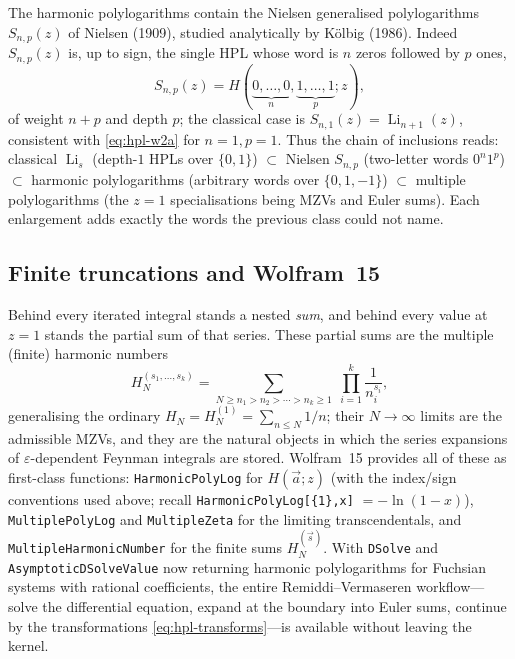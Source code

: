 \documentclass[11pt]{article}
\DeclareMathOperator{\Li}{Li}
\theoremstyle{plain}
\theoremstyle{remark}
\begin{document}
The harmonic polylogarithms contain the Nielsen generalised polylogarithms $S_{n,p}(z)$ of Nielsen (1909), studied analytically by K\"olbig (1986). Indeed $S_{n,p}(z)$ is, up to sign, the single HPL whose word is $n$ zeros followed by $p$ ones,
\begin{equation}\label{eq:nielsen}
  S_{n,p}(z)=H(\underbrace{0,\dots,0}_{n},\underbrace{1,\dots,1}_{p};z),
\end{equation}
of weight $n+p$ and depth $p$; the classical case is $S_{n,1}(z)=\Li_{n+1}(z)$, consistent with \eqref{eq:hpl-w2a} for $n=1,p=1$. Thus the chain of inclusions reads: classical $\Li_s$ (depth-$1$ HPLs over $\{0,1\}$) $\subset$ Nielsen $S_{n,p}$ (two-letter words $0^n1^p$) $\subset$ harmonic polylogarithms (arbitrary words over $\{0,1,-1\}$) $\subset$ multiple polylogarithms (the $z=1$ specialisations being MZVs and Euler sums). Each enlargement adds exactly the words the previous class could not name.

\subsection{Finite truncations and Wolfram~15}

Behind every iterated integral stands a nested \emph{sum}, and behind every value at $z=1$ stands the partial sum of that series. These partial sums are the multiple (finite) harmonic numbers
\[
  H^{(s_1,\dots,s_k)}_{N}=\sum_{N\ge n_1>n_2>\cdots>n_k\ge1}\;\prod_{i=1}^{k}\frac{1}{n_i^{s_i}},
\]
generalising the ordinary $H_N=H_N^{(1)}=\sum_{n\le N}1/n$; their $N\to\infty$ limits are the admissible MZVs, and they are the natural objects in which the series expansions of $\varepsilon$-dependent Feynman integrals are stored. Wolfram~15 provides all of these as first-class functions: \texttt{HarmonicPolyLog} for $H(\vec a;z)$ (with the index/sign conventions used above; recall \texttt{HarmonicPolyLog[\{1\},x]} $=-\ln(1-x)$), \texttt{MultiplePolyLog} and \texttt{MultipleZeta} for the limiting transcendentals, and \texttt{MultipleHarmonicNumber} for the finite sums $H^{(\vec s)}_N$. With \texttt{DSolve} and \texttt{AsymptoticDSolveValue} now returning harmonic polylogarithms for Fuchsian systems with rational coefficients, the entire Remiddi--Vermaseren workflow---solve the differential equation, expand at the boundary into Euler sums, continue by the transformations \eqref{eq:hpl-transforms}---is available without leaving the kernel.
\end{document}

